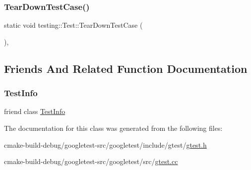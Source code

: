 \mbox{\label{classtesting_1_1Test_af374706cbaf0ffc460f4fd04e7c150f1}} 
\subsubsection{\texorpdfstring{TearDownTestCase()}{TearDownTestCase()}}
{\footnotesize\ttfamily static void testing\+::\+Test\+::\+Tear\+Down\+Test\+Case (\begin{DoxyParamCaption}{ }\end{DoxyParamCaption})\hspace{0.3cm}{\ttfamily [inline]}, {\ttfamily [static]}}



\subsection{Friends And Related Function Documentation}
\mbox{\label{classtesting_1_1Test_a4c49c2cdb6c328e6b709b4542f23de3c}} 
\subsubsection{\texorpdfstring{TestInfo}{TestInfo}}
{\footnotesize\ttfamily friend class \mbox{\hyperlink{classtesting_1_1TestInfo}{Test\+Info}}\hspace{0.3cm}{\ttfamily [friend]}}



The documentation for this class was generated from the following files\+:\begin{DoxyCompactItemize}
\item 
cmake-\/build-\/debug/googletest-\/src/googletest/include/gtest/\mbox{\hyperlink{gtest_8h}{gtest.\+h}}\item 
cmake-\/build-\/debug/googletest-\/src/googletest/src/\mbox{\hyperlink{gtest_8cc}{gtest.\+cc}}\end{DoxyCompactItemize}
